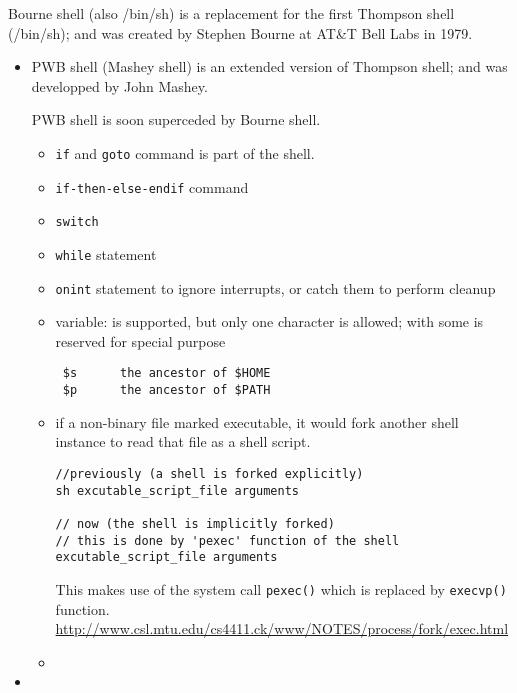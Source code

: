 Bourne shell (also /bin/sh) is a replacement for the first Thompson shell
(/bin/sh); and was created by Stephen Bourne at AT\&T Bell Labs in 1979.
\begin{itemize}
  \item PWB shell (Mashey shell) is an extended version of Thompson shell; and
  was developped by  John Mashey.
  
  PWB shell is soon superceded by Bourne shell.
  \begin{itemize}
    \item \verb!if! and \verb!goto! command is part of the shell.
    
    \item \verb!if-then-else-endif! command
    
    \item \verb!switch! 
    
    \item \verb!while! statement
    
    \item \verb!onint! statement to ignore interrupts, or catch them to perform
    cleanup
    
    \item variable: is supported, but only one character is allowed; with some
    is reserved for special purpose
    
 \begin{verbatim}
 $s      the ancestor of $HOME
 $p      the ancestor of $PATH
 \end{verbatim}
 
    \item  if a non-binary file marked executable, it would fork another shell
    instance to read that file as a shell script.
 
\begin{verbatim}
//previously (a shell is forked explicitly)
sh excutable_script_file arguments

// now (the shell is implicitly forked)
// this is done by 'pexec' function of the shell
excutable_script_file arguments
\end{verbatim}
This makes use of the system call \verb!pexec()! which is replaced by
\verb!execvp()! function.
\url{http://www.csl.mtu.edu/cs4411.ck/www/NOTES/process/fork/exec.html}

   \item 
  \end{itemize}
  
    \item 
\end{itemize}

